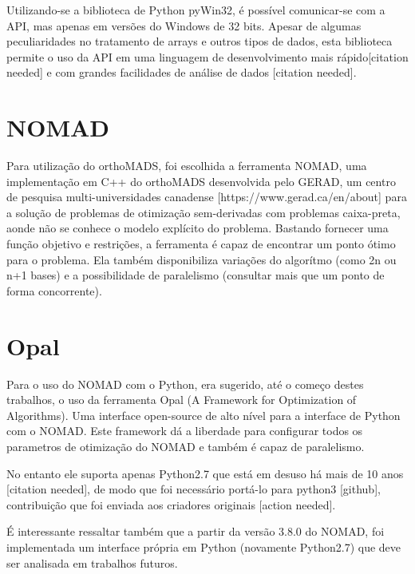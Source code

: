  Utilizando-se a biblioteca de Python pyWin32, é possível comunicar-se com a API, mas apenas em versões do Windows de 32 bits. Apesar de algumas peculiaridades no tratamento de arrays e outros tipos de dados, esta biblioteca permite o uso da API em uma linguagem de desenvolvimento mais rápido[citation needed] e com grandes facilidades de análise de dados [citation needed].

\section{NOMAD}
Para utilização do orthoMADS, foi escolhida a ferramenta NOMAD, uma implementação em C++ do orthoMADS desenvolvida pelo GERAD, um centro de pesquisa multi-universidades canadense [https://www.gerad.ca/en/about] para a solução de problemas de otimização sem-derivadas com problemas caixa-preta, aonde não se conhece o modelo explícito do problema. Bastando fornecer uma função objetivo e restrições, a ferramenta é capaz de encontrar um ponto ótimo para o problema. Ela também disponibiliza variações do algorítmo (como 2n ou n+1 bases) e a possibilidade de paralelismo (consultar mais que um ponto de forma concorrente).  

	

\section{Opal}
Para o uso do NOMAD com o Python, era sugerido, até o começo destes trabalhos, o uso da ferramenta Opal (A Framework for Optimization of Algorithms). Uma interface open-source de alto nível para a interface de Python com o NOMAD. Este framework dá a liberdade para configurar todos os parametros de otimização do NOMAD e também é capaz de paralelismo.

No entanto ele suporta apenas Python2.7 que está em desuso há mais de 10 anos [citation needed], de modo que foi necessário portá-lo para python3 [github], contribuição que foi enviada aos criadores originais [action needed].

É interessante ressaltar também que a partir da versão 3.8.0 do NOMAD, foi implementada um interface própria em Python (novamente Python2.7) que deve ser analisada em trabalhos futuros.




